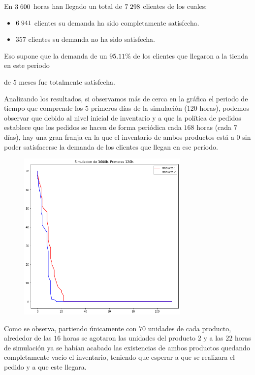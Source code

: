 \documentclass[a4paper,12pt]{article}
\begin{document}
	
	En $3\hspace{1mm}600$ horas han llegado un total de $7\hspace{1mm}298$ clientes de los cuales:
	
	\begin{itemize}
		\item $6\hspace{1mm}941$ clientes su demanda ha sido completamente satisfecha.
		\item $357$ clientes su demanda no ha sido satisfecha.
	\end{itemize}

	Eso supone que la demanda de un $95.11\%$ de los clientes que llegaron a la tienda en este periodo

	de $5$ meses fue totalmente satisfecha.
	
	Analizando los resultados, si observamos más de cerca en la gráfica el periodo de tiempo que
comprende los $5$ primeros días de la simulación ($120$ horas), podemos observar que debido al
nivel inicial de inventario y a que la política de pedidos establece que los pedidos se hacen de
forma periódica cada $168$ horas (cada $7$ días), hay una gran franja en la que el inventario de ambos
productos está a $0$ sin poder satisfacerse la demanda de los clientes que llegan en ese periodo.
	
	\begin{figure}[H]
		\centering
		\includegraphics[width=0.75\textwidth]{include/simulacion_5d.png}
	\end{figure}
	
	Como se observa, partiendo únicamente con $70$ unidades de cada producto, alrededor de las $16$ 	horas se agotaron las unidades del producto $2$ y a las $22$ horas de simulación ya se habían acabado las existencias de ambos productos quedando completamente vacío el inventario, teniendo que	esperar a que se realizara el pedido y a que este llegara.
\end{document}
